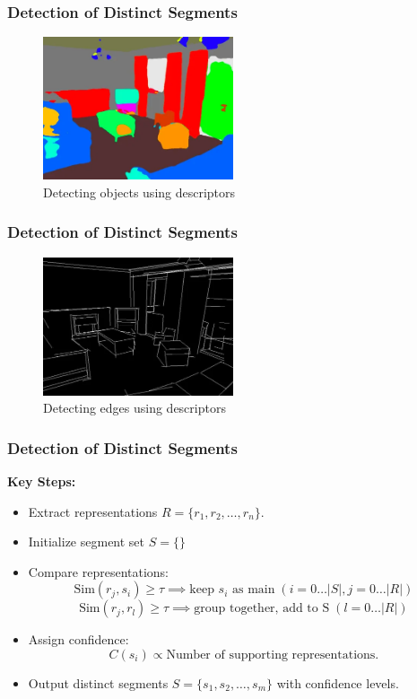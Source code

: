 \documentclass{beamer}
\begin{document}
\begin{frame}
\frametitle{Detection of Distinct Segments}

\begin{figure}[htbp]
    \centering
    \includegraphics[width=0.5\textwidth]{images/objdet.png}
    \caption{Detecting objects using descriptors}
    \label{fig:desc_objdet}
\end{figure}

\end{frame}

\begin{frame}
\frametitle{Detection of Distinct Segments}

\begin{figure}[htbp]
    \centering
    \includegraphics[width=0.5\textwidth]{images/edgedet.png}
    \caption{Detecting edges using descriptors}
    \label{fig:desc_objdet}
\end{figure}

\end{frame}

\begin{frame}
\frametitle{Detection of Distinct Segments}
\textbf{Key Steps:}
    \begin{itemize}
        \item Extract representations \( R = \{r_1, r_2, \dots, r_n\} \).
        \item Initialize segment set \(S=\{\}\)
        \item Compare representations:
        \[
        \text{Sim}(r_j,s_i) \geq \tau \implies \text{keep } s_i \text{ as main} \; (i = 0 \dots \lvert S \lvert, j=0\dots \lvert R \lvert)
         \]
         \[
         \text{Sim}(r_j, r_l) \geq \tau \implies \text{group together, add to S} \; (l=0\dots \lvert R \lvert)
         \]
        \item Assign confidence:
        \[
        C(s_i) \propto \text{Number of supporting representations.}
        \]
        \item Output distinct segments \( S = \{s_1, s_2, \dots, s_m\} \) with confidence levels.
    \end{itemize}
\end{frame}
\end{document}
